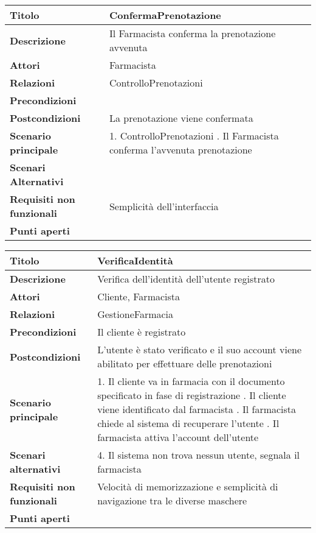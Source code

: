 \begin{tabular} {|P{4.5cm}|P{12.5cm}|}
\hline
  \textbf{Titolo} & ConfermaPrenotazione\\
\hline
  \textbf{Descrizione} & Il Farmacista conferma la prenotazione avvenuta\\
\hline
  \textbf{Attori} & Farmacista\\
\hline
  \textbf{Relazioni} & ControlloPrenotazioni\\
\hline
  \textbf{Precondizioni} &\\
\hline
  \textbf{Postcondizioni} & La prenotazione viene confermata\\
\hline
  \textbf{Scenario principale} & 1. ControlloPrenotazioni . Il Farmacista conferma l'avvenuta prenotazione\\
\hline
  \textbf{Scenari Alternativi} & \\
\hline
  \textbf{Requisiti non funzionali} & Semplicità dell'interfaccia\\
\hline
  \textbf{Punti aperti} &\\
\hline
\end{tabular}
\hfill
\break

\begin{tabular} {|P{4.5cm}|P{12.5cm}|}
  \hline
    \textbf{Titolo} & VerificaIdentità\\
  \hline
    \textbf{Descrizione} & Verifica dell'identità dell'utente registrato\\
  \hline
    \textbf{Attori} & Cliente, Farmacista\\
  \hline
    \textbf{Relazioni} & GestioneFarmacia\\
  \hline
    \textbf{Precondizioni} & Il cliente è registrato\\
  \hline
    \textbf{Postcondizioni} & L'utente è stato verificato e il suo account
    viene abilitato per effettuare delle prenotazioni\\
  \hline
    \textbf{Scenario principale} & 1. Il cliente va in farmacia con il
    documento specificato in fase di registrazione . Il cliente viene
    identificato dal farmacista . Il farmacista chiede al sistema di
    recuperare l'utente . Il farmacista attiva l'account dell'utente\\
  \hline
    \textbf{Scenari alternativi} & 4. Il sistema non trova nessun utente,
    segnala il farmacista\\
  \hline
  \textbf{Requisiti non funzionali} & Velocità di memorizzazione e semplicità
  di navigazione tra le diverse maschere\\
  \hline
    \textbf{Punti aperti} &\\
  \hline
\end{tabular}
\hfill
\break

